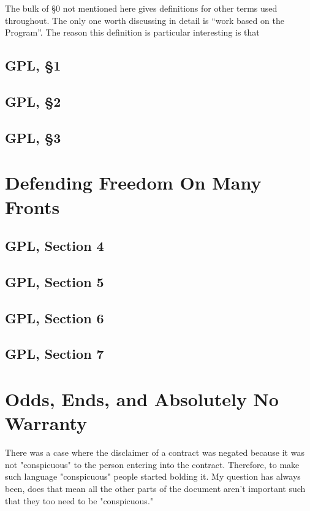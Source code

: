 \documentclass[12pt]{report}
\begin{document}
\medskip

The bulk of \S 0 not mentioned here gives definitions for other terms used
throughout.  The only one worth discussing in detail is ``work based on
the Program''.  The reason this definition is particular interesting is
that 


\section{GPL, \S 1}

\section{GPL, \S 2}

\section{GPL, \S 3}

\chapter{Defending Freedom On Many Fronts}

\section{GPL, Section 4}

\section{GPL, Section 5}
\label{GPLs5}

\section{GPL, Section 6}
\label{GPLs6}

\section{GPL, Section 7}
\label{GPLs7}

\chapter{Odds, Ends, and Absolutely No Warranty}

There was a case where the disclaimer of a contract was negated because it
was not "conspicuous" to the person entering into the contract.  Therefore,
to make such language "conspicuous" people started bolding it.  My question
has always been, does that mean all the other parts of the document aren't
important such that they too need to be "conspicuous."
\end{document}
